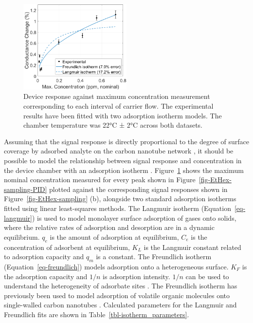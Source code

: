 \documentclass[
  a4paper,
]{scrbook}
\begin{document}
\begin{figure}

{\centering \includegraphics[width=0.5\textwidth,height=\textheight]{figures/ch6/EtHex-ratio-comparison.png}

}

\caption{\label{fig-EtHex-ratio-comparison}Device response against
maximum concentration measurement corresponding to each interval of
carrier flow. The experimental results have been fitted with two
adsorption isotherm models. The chamber temperature was 22°C ± 2°C
across both datasets.}

\end{figure}

Assuming that the signal response is directly proportional to the degree
of surface coverage by adsorbed analyte on the carbon nanotube network
\autocite{Lee2005}, it should be possible to model the relationship
between signal response and concentration in the device chamber with an
adsorption isotherm \autocite{Agnihotri2005}.
Figure~\ref{fig-EtHex-ratio-comparison} shows the maximum nominal
concentration measured for every peak shown in
Figure~\ref{fig-EtHex-sampling-PID} plotted against the corresponding
signal responses shown in Figure~\ref{fig-EtHex-sampling} (b), alongside
two standard adsorption isotherms fitted using linear least-squares
methods. The Langmuir isotherm (Equation~\ref{eq-langmuir}) is used to
model monolayer surface adsorption of gases onto solids, where the
relative rates of adsorption and desorption are in a dynamic
equilibrium. \(q_e\) is the amount of adsorption at equilibrium, \(C_e\)
is the concentration of adsorbent at equilibrium, \(K_L\) is the
Langmuir constant related to adsorption capacity and \(q_m\) is a
constant. The Freundlich isotherm (Equation~\ref{eq-freundlich}) models
adsorption onto a heterogeneous surface. \(K_F\) is the adsorption
capacity and \(1/n\) is adsorption intensity. \(1/n\) can be used to
understand the heterogeneity of adsorbate sites
\autocite{Ayawei2017,Sabzehmeidani2021}. The Freundlich isotherm has
previously been used to model adsorption of volatile organic molecules
onto single-walled carbon nanotubes \autocite{Agnihotri2005}. Calculated
parameters for the Langmuir and Freundlich fits are shown in
Table~\ref{tbl-isotherm_parameters}.
\end{document}
